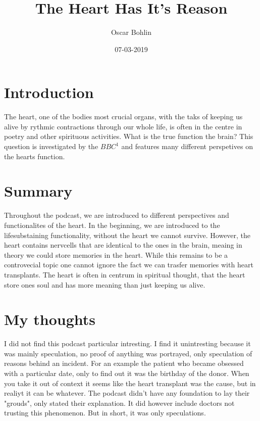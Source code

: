\documentclass[a4paper,12pt]{article}
\title{The Heart Has It's Reason}
\author{Oscar Bohlin}
\date{07-03-2019}
\begin{document}
\maketitle
\newpage
{}
\tableofcontents
\newpage
%

\section{Introduction}

    The heart, one of the bodies most crucial organs, with the taks of keeping us alive by rythmic contractions through our whole life, is often in the centre in poetry and other spirituous activities. What is the true function the brain? This question is investigated by the $BBC^1$ and features many different perspetives on the hearts function. 

\section{Summary}

    Throughout the podcast, we are introduced to different perspectives and functionalites of the heart. In the beginning, we are introduced to the lifesubstaining functionality, without the heart we cannot survive. However, the heart contains nervcells that are identical to the ones in the brain, meaing in theory we could store memories in the heart. While this remains to be a controvecial topic one cannot ignore the fact we can trasfer memories with heart transplants. The heart is often in centrum in spiritual thought, that the heart store ones soul and has more meaning than just keeping us alive. 

\section{My thoughts}

I did not find this podcast particular intresting. I find it unintresting because it was mainly speculation, no proof of anything was portrayed, only speculation of reasons behind an incident. For an example the patient who became obsessed with a particular date, only to find out it was the birthday of the donor. When you take it out of context it seems like the heart transplant was the cause, but in realiyt it can be whatever. The podcast didn't have any foundation to lay their "grouds", only stated their explanation. It did however include doctors not trusting this phenomenon. But in short, it was only speculations.
\end{document}

